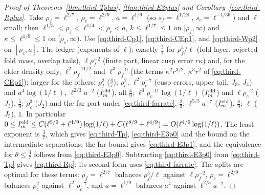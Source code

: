 \begin{proof}[Proof of Theorems~\ref{thm:third-Tplus}, \ref{thm:third-E3plus} and Corollary~\ref{cor:third-Rplus}]
Take $\rho_f=\ell^{2/7}$, $\rho_c=\ell^{2/9}$, $a=\ell^{1/9}$ (so $s_f=\ell^{1/28}$, $s_c=\ell^{-1/36}$) and $\ell$ small; then $\ell^{1/3}<\rho_f<\ell^{1/4}<\rho_c<a$, $k\le\ell^{1/7}\le1$ on $[\rho_f,\infty)$ and $\kappa\le\ell^{1/9}\le1$ on $[\rho_c,\infty)$. Use \eqref{eq:third-Cp1}, \eqref{eq:third-CEp1}, and \eqref{eq:third-Wp2} on $[\rho_c,a]$. The ledger (exponents of $\ell$): exactly $\frac37$ for $\rho_f^5/\ell$ (fold layer, rejected fold mass, overlap tails), $\ell\rho_f^{-2}$ (finite part, linear cusp error $r\kappa$) and, for the elder density only, $\ell^2\rho_f^{-11/2}$ and $\ell^3\rho_f^{-9}$ (the terms $\kappa^2r^{3/2}$, $\kappa^3r^2$ of \eqref{eq:third-CEp1}); larger for the others: $\rho_f^2$ ($\frac47$); $\rho_c^2$, $\ell^2\rho_c^{-7}$ (cusp errors, upper tail, $J_3$, $J_4$) and $a^4\log(1/\ell)$, $\ell^{2/3}a^{-2}$ ($I^{\mathrm{eld}}_m$), all $\frac49$; $\ell^3\rho_c^{-11}\log(1/\ell)$ ($I^{\mathrm{eld}}_m$) and $\ell\rho_c^{-2}$ ($J_3$), $\frac59$; $\rho_c^3$ ($J_2$) and the far part under \eqref{eq:third-farrate}, $\frac23$; $\ell^{5/3}a^{-7}$ ($I^{\mathrm{eld}}_m$), $\frac89$; $\ell$ ($J_5$), $1$. In particular $0\le I^{\mathrm{eld}}_m\le C(\ell^{5/9}+\ell^{4/9})\log(1/\ell)+C(\ell^{8/9}+\ell^{4/9})=O(\ell^{4/9}\log(1/\ell))$. The least exponent is $\frac37$, which gives \eqref{eq:third-Tp}, \eqref{eq:third-E3p0} and the bound on the intermediate separations; the far bound gives \eqref{eq:third-E3p1}, and the equivalence for $\theta\le\frac37$ follows from \eqref{eq:third-E3p0}. Subtracting \eqref{eq:third-E3p0} from \eqref{eq:third-Tp} gives \eqref{eq:third-Rp}; its second form uses \eqref{eq:third-farrate}. The splits are optimal for these terms: $\rho_f=\ell^{2/7}$ balances $\rho_f^5/\ell$ against $\ell\rho_f^{-2}$, $\rho_c=\ell^{2/9}$ balances $\rho_c^2$ against $\ell^2\rho_c^{-7}$, and $a=\ell^{1/9}$ balances $a^4$ against $\ell^{2/3}a^{-2}$.
\end{proof}
